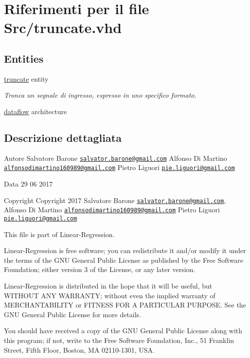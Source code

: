 \hypertarget{truncate_8vhd}{\section{Riferimenti per il file Src/truncate.vhd}
\label{truncate_8vhd}
}
\subsection*{Entities}
\begin{DoxyCompactItemize}
\item 
\hyperlink{classtruncate}{truncate} entity
\begin{DoxyCompactList}\small\item\em Tronca un segnale di ingresso, espresso in uno specifico formato. \end{DoxyCompactList}\item 
\hyperlink{classtruncate_1_1dataflow}{dataflow} architecture
\end{DoxyCompactItemize}


\subsection{Descrizione dettagliata}
\begin{DoxyAuthor}{Autore}
Salvatore Barone \href{mailto:salvator.barone@gmail.com}{\tt salvator.\+barone@gmail.\+com} Alfonso Di Martino \href{mailto:alfonsodimartino160989@gmail.com}{\tt alfonsodimartino160989@gmail.\+com} Pietro Liguori \href{mailto:pie.liguori@gmail.com}{\tt pie.\+liguori@gmail.\+com}
\end{DoxyAuthor}
\begin{DoxyDate}{Data}
29 06 2017
\end{DoxyDate}
\begin{DoxyCopyright}{Copyright}
Copyright 2017 Salvatore Barone \href{mailto:salvator.barone@gmail.com}{\tt salvator.\+barone@gmail.\+com}, Alfonso Di Martino \href{mailto:alfonsodimartino160989@gmail.com}{\tt alfonsodimartino160989@gmail.\+com} Pietro Liguori \href{mailto:pie.liguori@gmail.com}{\tt pie.\+liguori@gmail.\+com}
\end{DoxyCopyright}
This file is part of Linear-\/\+Regression.

Linear-\/\+Regression is free software; you can redistribute it and/or modify it under the terms of the G\+N\+U General Public License as published by the Free Software Foundation; either version 3 of the License, or any later version.

Linear-\/\+Regression is distributed in the hope that it will be useful, but W\+I\+T\+H\+O\+U\+T A\+N\+Y W\+A\+R\+R\+A\+N\+T\+Y; without even the implied warranty of M\+E\+R\+C\+H\+A\+N\+T\+A\+B\+I\+L\+I\+T\+Y or F\+I\+T\+N\+E\+S\+S F\+O\+R A P\+A\+R\+T\+I\+C\+U\+L\+A\+R P\+U\+R\+P\+O\+S\+E. See the G\+N\+U General Public License for more details.

You should have received a copy of the G\+N\+U General Public License along with this program; if not, write to the Free Software Foundation, Inc., 51 Franklin Street, Fifth Floor, Boston, M\+A 02110-\/1301, U\+S\+A. 